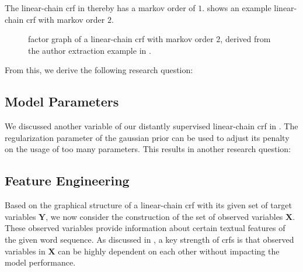 The \gls{linear-chain crf} in  thereby has a \gls{markov order} of $1$.
 shows an example \gls{linear-chain crf} with \gls{markov order} $2$.
\begin{figure}[t]
\centering

\caption{%
  \Gls{factor graph} of a \gls{linear-chain crf} with \gls{markov order} $2$, derived from the author extraction example in .}
\label{fig:example-linear-chain-crf-markov-order-2}
\end{figure}

From this, we derive the following research question:
\newcommand\researchquestionseven{}
\researchquestionseven%


\subsection{Model Parameters}\label{subsec:ae-model-parameters}

We discussed another variable of our distantly supervised \gls{linear-chain crf} in .
The regularization parameter of the \gls{gaussian prior} can be used to adjust its penalty on the usage of too many parameters.
This results in another research question:
\newcommand\researchquestioneight{}
\researchquestioneight%

\subsection{Feature Engineering}\label{subsec:ae-feature-engineering}

Based on the graphical structure of a \gls{linear-chain crf} with its given set of \glspl{target variable} $\mathbf{Y}$, we now consider the construction of the set of \glspl{observed variable} $\mathbf{X}$.
These \glspl{observed variable} provide information about certain textual features of the given word sequence.
As discussed in , a key strength of \glspl{crf} is that \glspl{observed variable} in $\mathbf{X}$ can be highly dependent on each other without impacting the model performance.


